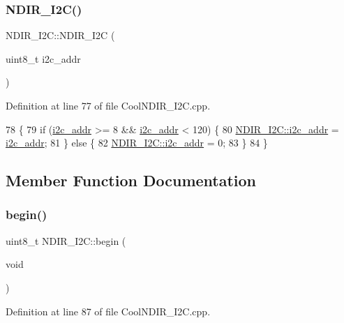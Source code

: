 \subsubsection{\texorpdfstring{N\+D\+I\+R\+\_\+\+I2\+C()}{NDIR\_I2C()}}
{\footnotesize\ttfamily N\+D\+I\+R\+\_\+\+I2\+C\+::\+N\+D\+I\+R\+\_\+\+I2C (\begin{DoxyParamCaption}\item[{uint8\+\_\+t}]{i2c\+\_\+addr }\end{DoxyParamCaption})}



Definition at line 77 of file Cool\+N\+D\+I\+R\+\_\+\+I2\+C.\+cpp.


\begin{DoxyCode}
78 \{
79     \textcolor{keywordflow}{if} (\hyperlink{class_n_d_i_r___i2_c_aac12069dd5a86a9ec6aa31ac9a44aabe}{i2c\_addr} >= 8 && \hyperlink{class_n_d_i_r___i2_c_aac12069dd5a86a9ec6aa31ac9a44aabe}{i2c\_addr} < 120) \{
80         \hyperlink{class_n_d_i_r___i2_c_aac12069dd5a86a9ec6aa31ac9a44aabe}{NDIR\_I2C::i2c\_addr} = \hyperlink{class_n_d_i_r___i2_c_aac12069dd5a86a9ec6aa31ac9a44aabe}{i2c\_addr};
81     \} \textcolor{keywordflow}{else} \{
82         \hyperlink{class_n_d_i_r___i2_c_aac12069dd5a86a9ec6aa31ac9a44aabe}{NDIR\_I2C::i2c\_addr} = 0;
83     \}
84 \}
\end{DoxyCode}


\subsection{Member Function Documentation}
\mbox{\label{class_n_d_i_r___i2_c_acf82f3dcb41e75709a93f8b68d087a3c}} 
\subsubsection{\texorpdfstring{begin()}{begin()}}
{\footnotesize\ttfamily uint8\+\_\+t N\+D\+I\+R\+\_\+\+I2\+C\+::begin (\begin{DoxyParamCaption}\item[{void}]{ }\end{DoxyParamCaption})}



Definition at line 87 of file Cool\+N\+D\+I\+R\+\_\+\+I2\+C.\+cpp.


